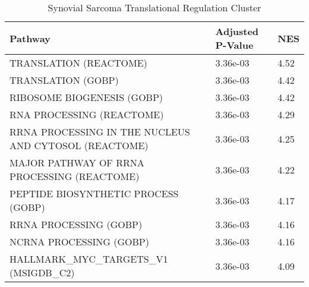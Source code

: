 \documentclass[varwidth=1000pt,border=10pt,convert={size=640x}]{standalone}
\begin{document}
	\begin{table}[h]
		\caption{Synovial Sarcoma Translational Regulation Cluster}
		\begin{tabular}{L{10cm}R{1.5cm}R{1.5cm}}
		\toprule
                                               Pathway &      Adjusted P-Value &   NES \\
\midrule
                                TRANSLATION (REACTOME) &  3.36e-03 &  4.52 \\
                                    TRANSLATION (GOBP) &  3.36e-03 &  4.42 \\
                            RIBOSOME BIOGENESIS (GOBP) &  3.36e-03 &  4.42 \\
                             RNA PROCESSING (REACTOME) &  3.36e-03 &  4.29 \\
RRNA PROCESSING IN THE NUCLEUS AND CYTOSOL (REACTOME) &  3.36e-03 &  4.25 \\
           MAJOR PATHWAY OF RRNA PROCESSING (REACTOME) &  3.36e-03 &  4.22 \\
                   PEPTIDE BIOSYNTHETIC PROCESS (GOBP) &  3.36e-03 &  4.17 \\
                                RRNA PROCESSING (GOBP) &  3.36e-03 &  4.16 \\
                               NCRNA PROCESSING (GOBP) &  3.36e-03 &  4.16 \\
               HALLMARK\_MYC\_TARGETS\_V1 (MSIGDB\_C2) &  3.36e-03 &  4.09 \\
\bottomrule
\end{tabular}
\end{table}
\end{document}
